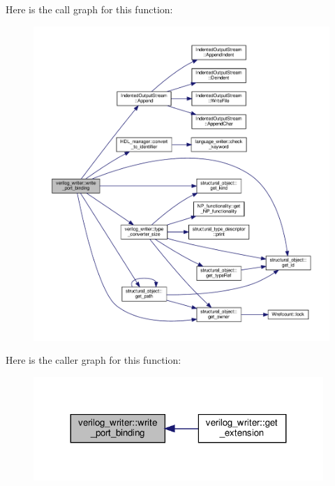 Here is the call graph for this function\+:
\nopagebreak
\begin{figure}[H]
\begin{center}
\leavevmode
\includegraphics[width=350pt]{d8/dba/classverilog__writer_a6c09eb18456ab75a1086e45ec464cae8_cgraph}
\end{center}
\end{figure}
Here is the caller graph for this function\+:
\nopagebreak
\begin{figure}[H]
\begin{center}
\leavevmode
\includegraphics[width=311pt]{d8/dba/classverilog__writer_a6c09eb18456ab75a1086e45ec464cae8_icgraph}
\end{center}
\end{figure}
\mbox{\label{classverilog__writer_a326f7f3aadac6d88b989a477360feb47}} 
